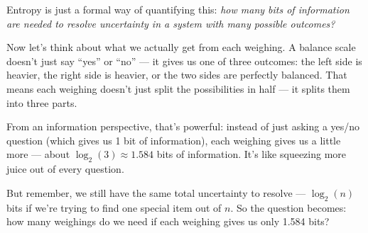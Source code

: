Entropy is just a formal way of quantifying this: \textit{how many bits of information are needed to resolve uncertainty in a system with many possible outcomes?}


\begin{center}
\end{center}






Now let’s think about what we actually get from each weighing. A balance scale doesn’t just say “yes” or “no” — it gives us one of three outcomes: the left side is heavier, the right side is heavier, or the two sides are perfectly balanced. That means each weighing doesn’t just split the possibilities in half — it splits them into three parts.

From an information perspective, that’s powerful: instead of just asking a yes/no question (which gives us 1 bit of information), each weighing gives us a little more — about \( \log_2(3) \approx 1.584 \) bits of information. It’s like squeezing more juice out of every question.

But remember, we still have the same total uncertainty to resolve — \( \log_2(n) \) bits if we’re trying to find one special item out of \( n \). So the question becomes: how many weighings do we need if each weighing gives us only 1.584 bits?


